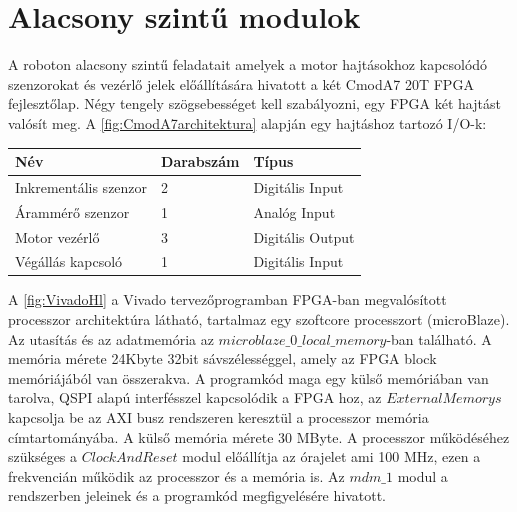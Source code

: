 
\section{Alacsony szintű modulok} 

A roboton alacsony szintű feladatait amelyek a motor hajtásokhoz kapcsolódó szenzorokat és vezérlő jelek előállítására hivatott a két CmodA7 20T FPGA fejlesztőlap. Négy tengely szögsebességet kell szabályozni, egy FPGA két hajtást valósít meg. A \ref{fig:CmodA7architektura} alapján egy hajtáshoz tartozó I/O-k:

\begin{table}[H]
\center
\begin{tabular}{lll}
\hline Név                            & Darabszám              & Típus  \\ \hline
Inkrementális szenzor           & 2           & Digitális Input \\
Árammérő szenzor                & 1                  & Analóg Input \\
Motor vezérlő                   & 3                  & Digitális Output \\
Végállás kapcsoló                 & 1                  & Digitális Input        
\end{tabular}
\end{table}




\renewcommand{\img}{SajatRobot/SzerkAbrak/cmoda7modulok.jpg}
\renewcommand{\sources}{*}
\renewcommand{\captionn}{CmodA7 FPGA-ban kialakított architektúra amely a szenzorok és motor hajtások jeleinek feldolgozását és előállítását valósítja meg }
\renewcommand{\figlabel}{CmodA7architektura}



A \ref{fig:VivadoHl} a Vivado tervezőprogramban FPGA-ban megvalósított processzor architektúra látható, tartalmaz egy szoftcore processzort (microBlaze). Az utasítás és az adatmemória az $microblaze\_0\_local\_memory$-ban található. A memória mérete 24Kbyte 32bit sávszélességgel, amely az FPGA block memóriájából van összerakva. A programkód maga egy külső memóriában van tarolva, QSPI alapú interfésszel kapcsolódik a FPGA hoz, az $ExternalMemorys$ kapcsolja be az AXI busz rendszeren keresztül a processzor memória címtartományába. A külső memória mérete 30 MByte. A processzor működéséhez szükséges a $ClockAndReset$ modul előállítja az órajelet ami 100 MHz, ezen a frekvencián működik az processzor és a memória is. Az $mdm\_1$ modul a rendszerben jeleinek és a programkód megfigyelésére hivatott.

